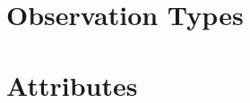 \documentclass{article}
\begin{document}
\section{Observation Types}


\section{Attributes}






\end{document}
